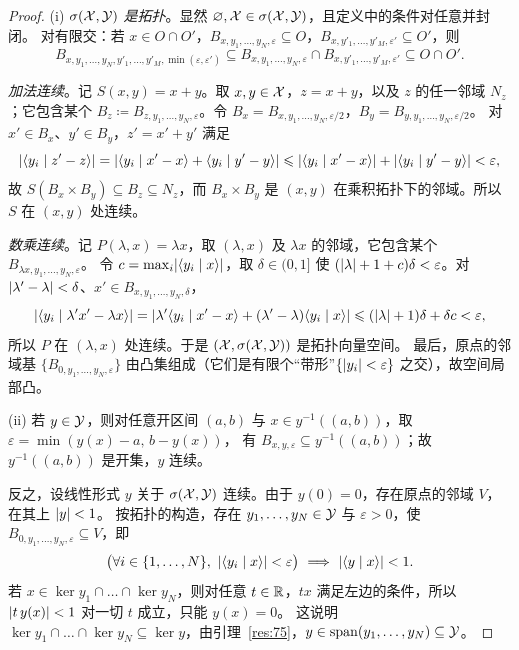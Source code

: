 \begin{proof}
(i) \emph{$\sigma(\mathcal{X},\mathcal{Y})$ 是拓扑}。显然 $\varnothing,\mathcal{X}\in\sigma(\mathcal{X},\mathcal{Y})$，且定义中的条件对任意并封闭。
对有限交：若 $x\in O\cap O'$，$B_{x,y_1,\dots,y_N,\varepsilon}\subseteq O$，$B_{x,y'_1,\dots,y'_M,\varepsilon'}\subseteq O'$，则
\[
  B_{x,y_1,\dots,y_N,y'_1,\dots,y'_M,\min(\varepsilon,\varepsilon')}\subseteq B_{x,y_1,\dots,y_N,\varepsilon}\cap B_{x,y'_1,\dots,y'_M,\varepsilon'}\subseteq O\cap O'.
\]

\emph{加法连续}。记 $S(x,y)=x+y$。取 $x,y\in\mathcal{X}$，$z=x+y$，以及 $z$ 的任一邻域 $N_z$；它包含某个
$B_z\coloneqq B_{z,y_1,\dots,y_N,\varepsilon}$。令 $B_x=B_{x,y_1,\dots,y_N,\varepsilon/2}$，$B_y=B_{y,y_1,\dots,y_N,\varepsilon/2}$。
对 $x'\in B_x$、$y'\in B_y$，$z'=x'+y'$ 满足
\[
  \lvert \langle y_i \mid z'-z\rangle\rvert=\lvert \langle y_i \mid x'-x\rangle+\langle y_i \mid y'-y\rangle\rvert\leqslant\lvert \langle y_i \mid x'-x\rangle\rvert+\lvert \langle y_i \mid y'-y\rangle\rvert<\varepsilon,
\]
故 $S(B_x\times B_y)\subseteq B_z\subseteq N_z$，而 $B_x\times B_y$ 是 $(x,y)$ 在乘积拓扑下的邻域。所以 $S$ 在 $(x,y)$ 处连续。

\emph{数乘连续}。记 $P(\lambda,x)=\lambda x$，取 $(\lambda,x)$ 及 $\lambda x$ 的邻域，它包含某个 $B_{\lambda x,y_1,\dots,y_N,\varepsilon}$。
令 $c=\max_i\lvert \langle y_i \mid x\rangle\rvert$，取 $\delta\in(0,1]$ 使 $(\lvert \lambda\rvert+1+c)\delta<\varepsilon$。对 $\lvert \lambda'-\lambda\rvert<\delta$、$x'\in B_{x,y_1,\dots,y_N,\delta}$，
\[
  \lvert \langle y_i \mid \lambda'x'-\lambda x\rangle\rvert
  =\lvert \lambda'\langle y_i \mid x'-x\rangle+(\lambda'-\lambda)\langle y_i \mid x\rangle\rvert
  \leqslant(\lvert \lambda\rvert+1)\delta+\delta c<\varepsilon,
\]
所以 $P$ 在 $(\lambda,x)$ 处连续。于是 $(\mathcal{X},\sigma(\mathcal{X},\mathcal{Y}))$ 是拓扑向量空间。
最后，原点的邻域基 $\{B_{0,y_1,\dots,y_N,\varepsilon}\}$ 由凸集组成（它们是有限个“带形”$\{\lvert y_i\rvert<\varepsilon\}$ 之交），故空间局部凸。

(ii) 若 $y\in\mathcal{Y}$，则对任意开区间 $(a,b)$ 与 $x\in y^{-1}((a,b))$，取 $\varepsilon=\min(y(x)-a,\,b-y(x))$，
有 $B_{x,y,\varepsilon}\subseteq y^{-1}((a,b))$；故 $y^{-1}((a,b))$ 是开集，$y$ 连续。

反之，设线性形式 $y$ 关于 $\sigma(\mathcal{X},\mathcal{Y})$ 连续。由于 $y(0)=0$，存在原点的邻域 $V$，在其上 $\lvert y\rvert<1$。
按拓扑的构造，存在 $y_1,\dots,y_N\in\mathcal{Y}$ 与 $\varepsilon>0$，使 $B_{0,y_1,\dots,y_N,\varepsilon}\subseteq V$，即
\[
  \bigl(\forall i\in\{1,\dots,N\},\ \abs{\pair{y_i}{x}}<\varepsilon\bigr)\ \Longrightarrow\ \abs{\pair{y}{x}}<1 .
\]
若 $x\in\ker y_1\cap\dots\cap\ker y_N$，则对任意 $t\in\mathbb{R}$，$tx$ 满足左边的条件，所以 $\lvert t\,y(x)\rvert<1$ 对一切 $t$ 成立，只能 $y(x)=0$。
这说明 $\ker y_1\cap\dots\cap\ker y_N\subseteq\ker y$，由引理~\ref{res:75}，$y\in\operatorname{span}(y_1,\dots,y_N)\subseteq\mathcal{Y}$。
\end{proof}

